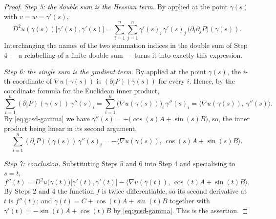 \begin{proof}
\emph{Step 5: the double sum is the Hessian term.} By 
applied at the point $\gamma(s)$ with $v=w=\gamma'(s)$,
\[
  D^2u(\gamma(s))\bigl[\gamma'(s),\gamma'(s)\bigr]
  =\sum_{i=1}^{n}\sum_{j=1}^{n}\gamma'(s)_i\,\gamma'(s)_j\,
     \bigl(\partial_i\partial_jP\bigr)(\gamma(s)).
\]
Interchanging the names of the two summation indices in the double sum of
Step 4 --- a relabelling of a finite double sum --- turns it into exactly this
expression.

\emph{Step 6: the single sum is the gradient term.} By
 applied at the point $\gamma(s)$, the $i$-th coordinate
of $\nabla u(\gamma(s))$ is $(\partial_iP)(\gamma(s))$ for every $i$. Hence, by
the coordinate formula for the Euclidean inner product,
\[
  \sum_{i=1}^{n}(\partial_iP)(\gamma(s))\,\gamma''(s)_i
  =\sum_{i=1}^{n}\bigl(\nabla u(\gamma(s))\bigr)_i\,\gamma''(s)_i
  =\bigl\langle\nabla u(\gamma(s)),\,\gamma''(s)\bigr\rangle .
\]
By \eqref{eq:gcsd-gamma} we have $\gamma''(s)=-\bigl(\cos(s)A+\sin(s)B\bigr)$,
so, the inner product being linear in its second argument,
\[
  \sum_{i=1}^{n}(\partial_iP)(\gamma(s))\,\gamma''(s)_i
  =-\bigl\langle\nabla u(\gamma(s)),\,\cos(s)A+\sin(s)B\bigr\rangle .
\]

\emph{Step 7: conclusion.} Substituting Steps 5 and 6 into Step 4 and
specialising to $s=t$,
\[
  f''(t)=D^2u\bigl(\gamma(t)\bigr)\bigl[\gamma'(t),\gamma'(t)\bigr]
   -\bigl\langle\nabla u(\gamma(t)),\,\cos(t)A+\sin(t)B\bigr\rangle .
\]
By Steps 2 and 4 the function $f$ is twice differentiable, so its second
derivative at $t$ is $f''(t)$; and $\gamma(t)=C+\cos(t)A+\sin(t)B$ together with
$\gamma'(t)=-\sin(t)A+\cos(t)B$ by \eqref{eq:gcsd-gamma}. This is the assertion.
\end{proof}
